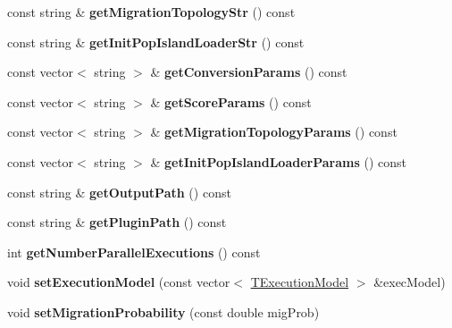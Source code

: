 \begin{DoxyCompactItemize}
const string \& {\bfseries get\+Migration\+Topology\+Str} () const
\item 
\mbox{\label{classConfiguration_a2bcfaf05104e6dfd8060366481a22440}} 
const string \& {\bfseries get\+Init\+Pop\+Island\+Loader\+Str} () const
\item 
\mbox{\label{classConfiguration_a8a6f669734318edf7c55eed4f60f0cde}} 
const vector$<$ string $>$ \& {\bfseries get\+Conversion\+Params} () const
\item 
\mbox{\label{classConfiguration_a30fa992a39a509d3db0980088162d450}} 
const vector$<$ string $>$ \& {\bfseries get\+Score\+Params} () const
\item 
\mbox{\label{classConfiguration_a498b756fee849f0c83fa6e592a82c5ba}} 
const vector$<$ string $>$ \& {\bfseries get\+Migration\+Topology\+Params} () const
\item 
\mbox{\label{classConfiguration_a2bd3583eab3c04567577cfbc0c01ac3c}} 
const vector$<$ string $>$ \& {\bfseries get\+Init\+Pop\+Island\+Loader\+Params} () const
\item 
\mbox{\label{classConfiguration_a6f555171c9576f68db664aecc59e0ec9}} 
const string \& {\bfseries get\+Output\+Path} () const
\item 
\mbox{\label{classConfiguration_aa61efa283a1a44d71729be6d272c2983}} 
const string \& {\bfseries get\+Plugin\+Path} () const
\item 
\mbox{\label{classConfiguration_ae36ccc57a394a54196586cca6a20de3e}} 
int {\bfseries get\+Number\+Parallel\+Executions} () const
\item 
\mbox{\label{classConfiguration_ad262bf75981aa04aaab1e771b4e5f1f4}} 
void {\bfseries set\+Execution\+Model} (const vector$<$ \mbox{\hyperlink{structTExecutionModel}{T\+Execution\+Model}} $>$ \&exec\+Model)
\item 
\mbox{\label{classConfiguration_af5ed93a89fa00cbdbe570d79745c8a4d}} 
void {\bfseries set\+Migration\+Probability} (const double mig\+Prob)

\end{DoxyCompactItemize}
